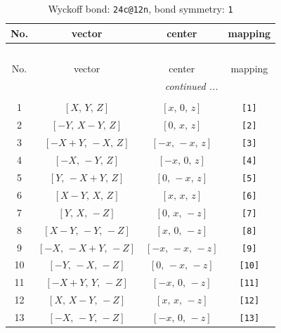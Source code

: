 \documentclass[fleqn,8pt]{jsarticle}
\begin{document}
\begin{longtable}{cccc}
\caption{Wyckoff bond: {\tt 24c@12n}, bond symmetry: {\tt 1}}
 \\
 \hline \hline
No. & vector & center & mapping \\ \hline \endfirsthead

\multicolumn{3}{l}{\tablename\ \thetable{}} \\
 \hline \hline
No. & vector & center & mapping \\ \hline \endhead

 \hline \hline
\multicolumn{3}{r}{\footnotesize\it continued ...} \\ \endfoot

 \hline \hline
\multicolumn{3}{r}{} \\ \endlastfoot

1 & $\left[ X,\, Y,\, Z \right]$ & $\left[ x,\, 0,\, z \right]$ & {\tt [1]} \\ \hline
2 & $\left[ - Y,\, X - Y,\, Z \right]$ & $\left[ 0,\, x,\, z \right]$ & {\tt [2]} \\ \hline
3 & $\left[ - X + Y,\, - X,\, Z \right]$ & $\left[ - x,\, - x,\, z \right]$ & {\tt [3]} \\ \hline
4 & $\left[ - X,\, - Y,\, Z \right]$ & $\left[ - x,\, 0,\, z \right]$ & {\tt [4]} \\ \hline
5 & $\left[ Y,\, - X + Y,\, Z \right]$ & $\left[ 0,\, - x,\, z \right]$ & {\tt [5]} \\ \hline
6 & $\left[ X - Y,\, X,\, Z \right]$ & $\left[ x,\, x,\, z \right]$ & {\tt [6]} \\ \hline
7 & $\left[ Y,\, X,\, - Z \right]$ & $\left[ 0,\, x,\, - z \right]$ & {\tt [7]} \\ \hline
8 & $\left[ X - Y,\, - Y,\, - Z \right]$ & $\left[ x,\, 0,\, - z \right]$ & {\tt [8]} \\ \hline
9 & $\left[ - X,\, - X + Y,\, - Z \right]$ & $\left[ - x,\, - x,\, - z \right]$ & {\tt [9]} \\ \hline
10 & $\left[ - Y,\, - X,\, - Z \right]$ & $\left[ 0,\, - x,\, - z \right]$ & {\tt [10]} \\ \hline
11 & $\left[ - X + Y,\, Y,\, - Z \right]$ & $\left[ - x,\, 0,\, - z \right]$ & {\tt [11]} \\ \hline
12 & $\left[ X,\, X - Y,\, - Z \right]$ & $\left[ x,\, x,\, - z \right]$ & {\tt [12]} \\ \hline
13 & $\left[ - X,\, - Y,\, - Z \right]$ & $\left[ - x,\, 0,\, - z \right]$ & {\tt [13]} \\ \hline

\end{longtable}
\end{document}

